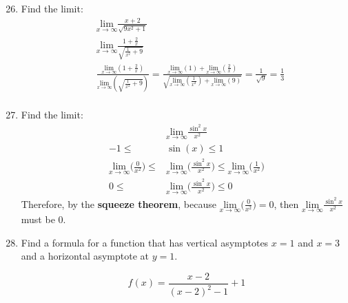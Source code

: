 \documentclass{article}
\begin{document}
\begin{enumerate}
\setcounter{enumi}{25}
	\item Find the limit: 
	$$\begin{aligned}
		&\underset{x \rightarrow \infty}{\text{lim}}\frac{x+2}{\sqrt{9x^2+1}}\\
		&\underset{x \rightarrow \infty}{\text{lim}}\frac{1+\frac{2}{x}}{\sqrt{\frac{1}{x^2}+9}}\\
		&\frac{\underset{x \rightarrow \infty}{\text{lim}}(1+\frac{2}{x})}{\underset{x \rightarrow \infty}{\text{lim}}(\sqrt{\frac{1}{x^2}+9})} = \frac{\underset{x \rightarrow \infty}{\text{lim}}(1)+\underset{x \rightarrow \infty}{\text{lim}}(\frac{2}{x})}{\sqrt{\underset{x \rightarrow \infty}{\text{lim}}(\frac{1}{x^2})+\underset{x \rightarrow \infty}{\text{lim}}(9)}}= \frac{1}{\sqrt{9}}=\frac{1}{3}\\
	\end{aligned}$$
\setcounter{enumi}{31}
	\item Find the limit: 
	$$\begin{aligned}	
		&\underset{x \rightarrow \infty}{\text{lim}}\frac{\sin^2x}{x^2}\\
		-1 \leq &\sin(x) \leq 1\\
		\underset{x \rightarrow \infty}{\text{lim}}\Big(\frac{0}{x^2}\Big) \leq &\underset{x \rightarrow \infty}{\text{lim}} \Big(\frac{\sin^2 x}{x^2}\Big)\leq \underset{x \rightarrow \infty}{\text{lim}} \Big(\frac{1}{x^2}\Big)\\
		0 \leq &\underset{x \rightarrow \infty}{\text{lim}} \Big(\frac{\sin^2 x}{x^2}\Big)\leq 0
	\end{aligned}$$
	Therefore, by the \textbf{squeeze theorem}, because $\underset{x \rightarrow \infty}{\text{lim}}\Big(\frac{0}{x^2}\Big)=0$, then $\underset{x \rightarrow \infty}{\text{lim}}\frac{\sin^2x}{x^2}$ must be $0$.
\setcounter{enumi}{47}
	\item Find a formula for a function that has vertical asymptotes $x=1$ and $x=3$ and a horizontal asymptote at $y=1$.
		\begin{center}
		\begin{minipage}{.3\textwidth}
		\begin{center}
			$$f(x)=\frac{x-2}{(x-2)^2-1}+1$$
		\end{center}
		\end{minipage}%
		\begin{minipage}{.7\textwidth}
		

\end{minipage}
\end{center}
\end{enumerate}
\end{document}
